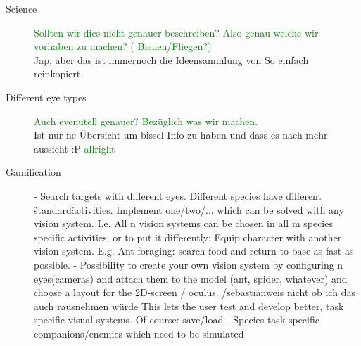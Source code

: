 \documentclass{acm_proc_article-sp}
\newcommand{\sebastian}[1]{\textcolor{Green}{#1}}
\newcommand{\stefan}[1]{\textcolor{BurntOrange}{#1}}
\begin{document}
\begin{description}
  \item[Science]
  \sebastian{Sollten wir dies nicht genauer beschreiben? Also genau welche wir
  vorhaben zu machen? ( Bienen/Fliegen?)}\\
  \stefan{Jap, aber das ist immernoch die Ideensammlung von So einfach
  reinkopiert.}

\item[Different eye types]
\sebastian{Auch evenutell genauer? Bezüglich was wir machen.}\\
\stefan{Ist nur ne Übersicht um bissel Info zu haben und dass es nach mehr
aussieht :P}
\sebastian{allright}

\item[Gamification]
- Search targets with different eyes. Different species have different
  \"standard\" activities.
  Implement one/two/... which can be solved with any vision system.
  I.e. All n vision systems can be chosen in all m species specific activities,
  or to put it differently: Equip character with another vision system.
  E.g. Ant foraging: search food and return to base as fast as possible.
- Possibility to create your own vision system by configuring n eyes(cameras)
  and attach them to the model (ant, spider, whatever) and choose a layout
  for the 2D-screen / oculus.
  /sebastian{weis nicht ob ich das auch rausnehmen würde}
  This lets the user test and develop better, task specific visual systems.
  Of course: save/load
- Species-task specific companions/enemies which need to be simulated


\end{description}
\end{document}

